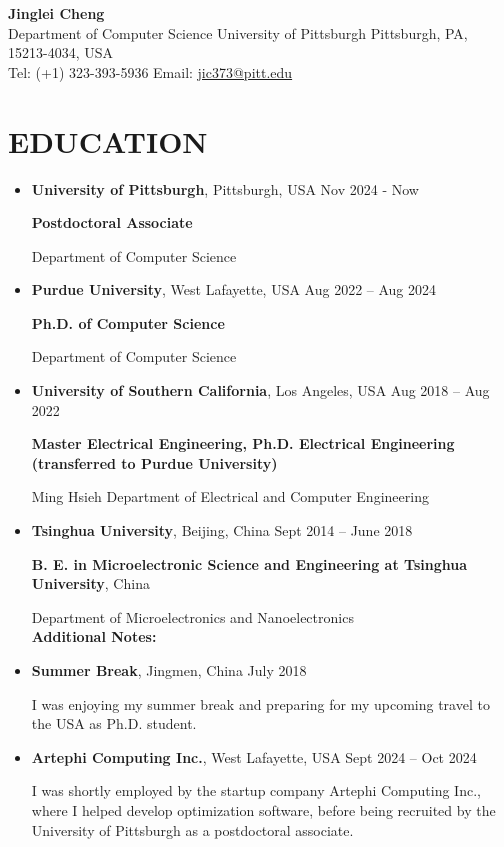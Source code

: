 \documentclass[11pt,a4paper]{article}
\begin{document}
\begin{center}
{\LARGE\textbf{Jinglei Cheng}} \\
\medskip
Department of Computer Science \textbar{} University of Pittsburgh \textbar{} Pittsburgh, PA, 15213-4034, USA\\
Tel: (+1) 323-393-5936 \textbar{} Email: \href{mailto:jic373@pitt.edu}{jic373@pitt.edu}
\end{center}

\section*{EDUCATION}

\begin{itemize}

\item 
\textbf{University of Pittsburgh}, Pittsburgh, USA \hfill Nov 2024 - Now

\textbf{Postdoctoral Associate}

Department of Computer Science

\item 
\textbf{Purdue University}, West Lafayette, USA \hfill Aug 2022 -- Aug 2024

\textbf{Ph.D. of Computer Science}

Department of Computer Science

\item
\textbf{University of Southern California}, Los Angeles, USA \hfill Aug 2018 -- Aug 2022

\textbf{Master Electrical Engineering, Ph.D. Electrical Engineering (transferred to Purdue University)}

Ming Hsieh Department of Electrical and Computer Engineering    

\item 
\textbf{Tsinghua University}, Beijing, China \hfill Sept 2014 -- June 2018

\textbf{B. E. in Microelectronic Science and Engineering at Tsinghua University}, China

Department of Microelectronics and Nanoelectronics    \\

\textbf{Additional Notes:}

\item \textbf{Summer Break}, Jingmen, China \hfill July 2018

I was enjoying my summer break and preparing for my upcoming travel to the USA as Ph.D. student.

\item \textbf{Artephi Computing Inc.}, West Lafayette, USA \hfill Sept 2024 -- Oct 2024

I was shortly employed by the startup company Artephi Computing Inc., where I helped develop optimization software, before being recruited by the University of Pittsburgh as a postdoctoral associate.

\end{itemize}
\end{document}
